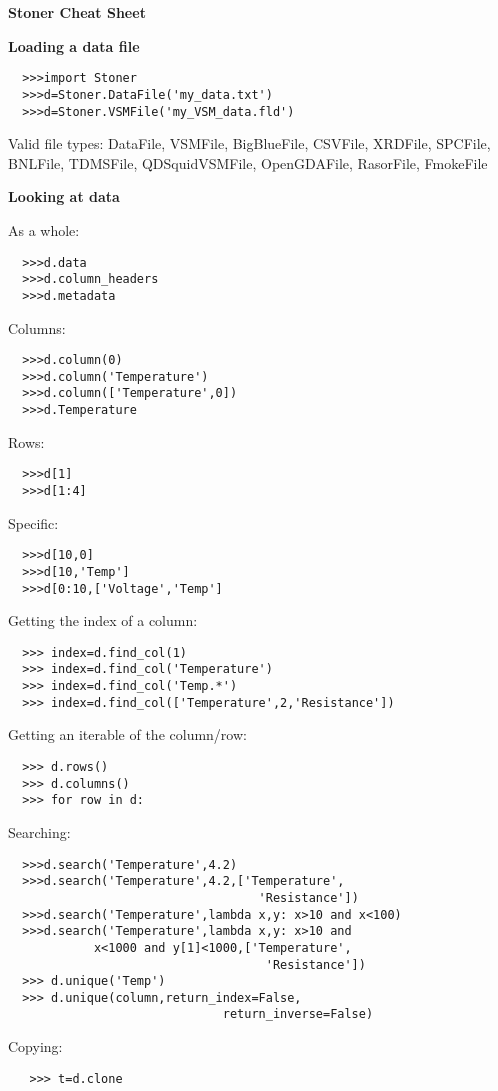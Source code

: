 \documentclass[a4paper,9pt,threecolumn,landscape]{scrartcl}
\begin{document}
\setlength{\parindent}{0pt}
\columnsep 1cm
\columnseprule 0.4pt
\begin{multicols}{3}{
{\huge \textbf{Stoner Cheat Sheet}}
\vspace{0.5cm}

\textbf {Loading a data file}
\vspace{0.2cm}
\normalfont
\begin{verbatim}
  >>>import Stoner
  >>>d=Stoner.DataFile('my_data.txt')
  >>>d=Stoner.VSMFile('my_VSM_data.fld')
\end{verbatim}
Valid file types:
DataFile,
VSMFile,
BigBlueFile,
CSVFile,
XRDFile,
SPCFile,
BNLFile,
TDMSFile,
QDSquidVSMFile,
OpenGDAFile,
RasorFile,
FmokeFile

\vspace{0.5cm}
\textbf {Looking at data}
\vspace{0.2cm}

\normalfont As a whole:
\begin{verbatim}
  >>>d.data
  >>>d.column_headers
  >>>d.metadata
\end{verbatim}
Columns:
\begin{verbatim}
  >>>d.column(0)
  >>>d.column('Temperature')
  >>>d.column(['Temperature',0])
  >>>d.Temperature
\end{verbatim}
Rows:
\begin{verbatim}
  >>>d[1]
  >>>d[1:4]
\end{verbatim}
Specific:
\begin{verbatim}
  >>>d[10,0]
  >>>d[10,'Temp']
  >>>d[0:10,['Voltage','Temp']
\end{verbatim}
Getting the index of a column:
\begin{verbatim}
  >>> index=d.find_col(1)
  >>> index=d.find_col('Temperature')
  >>> index=d.find_col('Temp.*')
  >>> index=d.find_col(['Temperature',2,'Resistance'])
\end{verbatim}
Getting an iterable of the column/row:
\begin{verbatim}
  >>> d.rows()
  >>> d.columns()
  >>> for row in d:
\end{verbatim}
Searching:
\begin{verbatim}
  >>>d.search('Temperature',4.2)
  >>>d.search('Temperature',4.2,['Temperature',
                                   'Resistance'])
  >>>d.search('Temperature',lambda x,y: x>10 and x<100)
  >>>d.search('Temperature',lambda x,y: x>10 and
            x<1000 and y[1]<1000,['Temperature',
                                    'Resistance'])
  >>> d.unique('Temp')
  >>> d.unique(column,return_index=False, 
                              return_inverse=False)          
\end{verbatim}
Copying:
\begin{verbatim}
   >>> t=d.clone
\end{verbatim}

}
\end{multicols}
\end{document}
